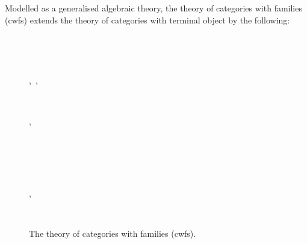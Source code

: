 \note
Modelled as a generalised algebraic theory, the theory of categories with families (cwfs) extends the theory of categories with terminal object by the following:

\begin{figure} [H]
\caption{The theory of categories with families (cwfs).}
\label{theorycwf}
\begin{gatrules}
\gatintros
{}
\begin{gatgroup}{}
     \dotfill\\
             {}
\end{gatgroup} \\

\gatintroducing{ ^* \\^*}
\begin{gatgroup}{,\ ,\ }
     \\
     { }
\end{gatgroup} \\

\begin{gatgroup}{,\ }
 \\
 \\
\end{gatgroup} \\

\gatintroducing{\tuple{,}}
\begin{gatgroupnoshared}
\end{gatgroupnoshared} \\

\gataxioms 
{}
\begin{gatgroup}{,\ }   
						  \\
\end{gatgroup} \\


\end{gatrules}
\end{figure}
